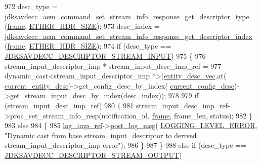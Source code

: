 \begin{DoxyCode}
{{972         desc\_type = 
      \hyperlink{group__command__set__stream__info__response_ga2af288f63567f10108700f344f7ed7c2}{jdksavdecc\_aem\_command\_set\_stream\_info\_response\_get\_descriptor\_type}
      (\hyperlink{gst__avb__playbin_8c_ac8e710e0b5e994c0545d75d69868c6f0}{frame}, \hyperlink{namespaceavdecc__lib_a6c827b1a0d973e18119c5e3da518e65ca9512ad9b34302ba7048d88197e0a2dc0}{ETHER\_HDR\_SIZE});
973         desc\_index = 
      \hyperlink{group__command__set__stream__info__response_ga5beccd46178ec84a68905e0520124ef5}{jdksavdecc\_aem\_command\_set\_stream\_info\_response\_get\_descriptor\_index}
      (\hyperlink{gst__avb__playbin_8c_ac8e710e0b5e994c0545d75d69868c6f0}{frame}, \hyperlink{namespaceavdecc__lib_a6c827b1a0d973e18119c5e3da518e65ca9512ad9b34302ba7048d88197e0a2dc0}{ETHER\_HDR\_SIZE});
974         \textcolor{keywordflow}{if} (desc\_type == \hyperlink{group__descriptor_ga4eb0b7597f11b5fc36f3625acd82e503}{JDKSAVDECC\_DESCRIPTOR\_STREAM\_INPUT})
975         \{
976             stream\_input\_descriptor\_imp * stream\_input\_desc\_imp\_ref =
977                 \textcolor{keyword}{dynamic\_cast<}stream\_input\_descriptor\_imp *\textcolor{keyword}{>}(\hyperlink{classavdecc__lib_1_1end__station__imp_a72edab41bc56e3c1757944a7df188a3d}{entity\_desc\_vec}.at(
      \hyperlink{classavdecc__lib_1_1end__station__imp_afd78c89df26ba7641e1adb764c0e827d}{current\_entity\_desc})->get\_config\_desc\_by\_index(
      \hyperlink{classavdecc__lib_1_1end__station__imp_a60b1af40d35e8a86b0082c54ab6cb6a8}{current\_config\_desc})->get\_stream\_input\_desc\_by\_index(desc\_index));
978 
979             \textcolor{keywordflow}{if} (stream\_input\_desc\_imp\_ref)
980             \{
981                 stream\_input\_desc\_imp\_ref->proc\_set\_stream\_info\_resp(notification\_id, 
      \hyperlink{gst__avb__playbin_8c_ac8e710e0b5e994c0545d75d69868c6f0}{frame}, frame\_len, status);
982             \}
983             \textcolor{keywordflow}{else}
984             \{
985                 \hyperlink{namespaceavdecc__lib_acbe3e2a96ae6524943ca532c87a28529}{log\_imp\_ref}->\hyperlink{classavdecc__lib_1_1log_a68139a6297697e4ccebf36ccfd02e44a}{post\_log\_msg}(
      \hyperlink{namespaceavdecc__lib_a501055c431e6872ef46f252ad13f85cdaf2c4481208273451a6f5c7bb9770ec8a}{LOGGING\_LEVEL\_ERROR}, \textcolor{stringliteral}{"Dynamic cast from base stream\_input\_descriptor to derived
       stream\_input\_descriptor\_imp error"});
986             \}
987         \}
988         \textcolor{keywordflow}{else} \textcolor{keywordflow}{if} (desc\_type == \hyperlink{group__descriptor_gab458eb4963f42bfa5591d5dd604bedce}{JDKSAVDECC\_DESCRIPTOR\_STREAM\_OUTPUT})
}}
\end{DoxyCode}
